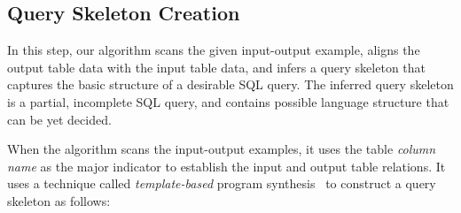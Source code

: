 \subsection{Query Skeleton Creation}
\label{sec:skeleton}

In this step, our algorithm scans the given input-output example, aligns the output table data
with the input table data, and infers a query skeleton that captures the basic structure
of a desirable SQL query. The inferred query skeleton is a partial, incomplete SQL query, and
contains possible language structure that can be yet decided.

When the algorithm scans the input-output examples, it uses the table \textit{column name}
as the major indicator to establish the input and output table relations. It uses a technique called
\textit{template-based} program synthesis~\cite{sttt-synthesis} to construct a query skeleton as follows:


